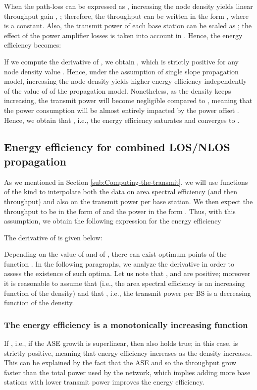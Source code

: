 \documentclass[twocoumn]{IEEEtran}
\begin{document}
When the path-loss can be expressed as ,
increasing the node density yields linear throughput gain \cite{Galiotto2013}, \cite{Ling2012}; therefore, the throughput can be written in the form , where  is a constant. Also, the transmit power of each base station
can be scaled as  \cite{Galiotto2013}; the effect of the power amplifier losses is taken into account in . Hence, the energy efficiency becomes: 

If we compute the derivative of , we obtain
,
which is strictly positive for any node density value . Hence,
under the assumption of single slope propagation model, increasing
the node density yields higher energy efficiency independently of the value of  of the propagation model. Nonetheless, as the density keeps increasing, the transmit power will become negligible compared to , meaning that the power consumption will be almost entirely impacted by the power offset . Hence, we obtain that , i.e., the energy efficiency saturates and converges to .

\vspace{-6mm}
\subsection{Energy efficiency for combined LOS/NLOS propagation}\label{sub:Energy-efficiency-for}

As we mentioned in Section \ref{sub:Computing-the-transmit}, we will use functions of the
kind  to interpolate both the data on area spectral
efficiency (and then throughput) and also on the transmit power per
base station. We then expect the throughput to be in the form of 
and the power in the form .
Thus, with this assumption, we obtain the following expression for
the energy efficiency 

The derivative of  is given below: 

Depending on the value of  and of , there can exist optimum points of the function . In the following paragraphs, we analyze the derivative  in order to assess the existence of such optima. Let us note that ,  and  are positive; moreover it is reasonable to assume that  (i.e., the area spectral efficiency is an increasing function of the density) and that , i.e., the transmit power per BS is a decreasing function of the density.
\subsubsection{The energy efficiency is a monotonically increasing function}	If , i.e., if the ASE growth is superlinear, then also  holds true; in this case,  is strictly positive, meaning that energy efficiency increases as the density increases. This can be explained by the fact that the ASE and so the throughput grow faster than the total power used by the network, which implies adding more base stations with lower transmit power improves the energy efficiency.
\end{document}
